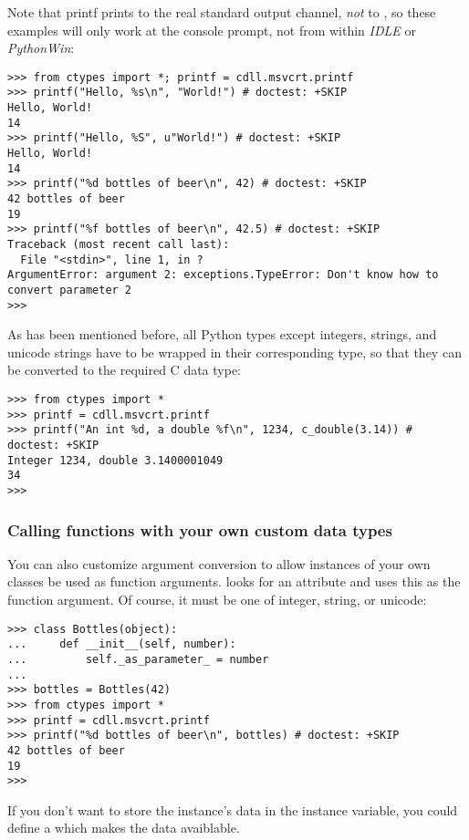 Note that printf prints to the real standard output channel, \emph{not} to
, so these examples will only work at the console
prompt, not from within \emph{IDLE} or \emph{PythonWin}:
\begin{verbatim}
>>> from ctypes import *; printf = cdll.msvcrt.printf
>>> printf("Hello, %s\n", "World!") # doctest: +SKIP
Hello, World!
14
>>> printf("Hello, %S", u"World!") # doctest: +SKIP
Hello, World!
14
>>> printf("%d bottles of beer\n", 42) # doctest: +SKIP
42 bottles of beer
19
>>> printf("%f bottles of beer\n", 42.5) # doctest: +SKIP
Traceback (most recent call last):
  File "<stdin>", line 1, in ?
ArgumentError: argument 2: exceptions.TypeError: Don't know how to convert parameter 2
>>>
\end{verbatim}

As has been mentioned before, all Python types except integers,
strings, and unicode strings have to be wrapped in their corresponding
 type, so that they can be converted to the required C data
type:
\begin{verbatim}
>>> from ctypes import *
>>> printf = cdll.msvcrt.printf
>>> printf("An int %d, a double %f\n", 1234, c_double(3.14)) # doctest: +SKIP
Integer 1234, double 3.1400001049
34
>>>
\end{verbatim}


\subsubsection{Calling functions with your own custom data types\label{ctypes-calling-functions-with-own-custom-data-types}}

You can also customize  argument conversion to allow
instances of your own classes be used as function arguments.
 looks for an  attribute and uses this as
the function argument. Of course, it must be one of integer, string,
or unicode:
\begin{verbatim}
>>> class Bottles(object):
...     def __init__(self, number):
...         self._as_parameter_ = number
...
>>> bottles = Bottles(42)
>>> from ctypes import *
>>> printf = cdll.msvcrt.printf
>>> printf("%d bottles of beer\n", bottles) # doctest: +SKIP
42 bottles of beer
19
>>>
\end{verbatim}

If you don't want to store the instance's data in the
 instance variable, you could define a 
which makes the data avaiblable.


